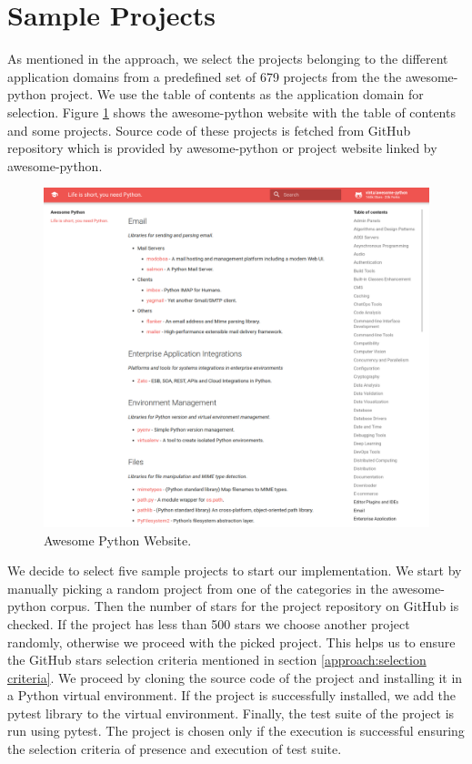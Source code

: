 \section{Sample Projects}
\label{impl:Sample Projects}
As mentioned in the approach, we select the projects belonging to the different application domains from a predefined set of 679 projects from the the awesome-python project.
We use the table of contents as the application domain for selection.
Figure \ref{fig:awesome-python-website} shows the awesome-python website with the table of contents and some projects.
Source code of these projects is fetched from GitHub repository which is provided by awesome-python or project website linked by awesome-python.  
\begin{figure}
    \centering
    \includegraphics[width=1\linewidth, height=1\linewidth]{figures/implementation/Awesome-Python-website3.png}
    \caption{Awesome Python Website.}
    \label{fig:awesome-python-website}
\end{figure}

We decide to select five sample projects to start our implementation.
We start by manually picking a random project from one of the categories in the awesome-python corpus.
Then the number of stars for the project repository on GitHub is checked.
If the project has less than 500 stars we choose another project randomly, otherwise we proceed with the picked project.
This helps us to ensure the GitHub stars selection criteria mentioned in section \ref{approach:selection criteria}.
We proceed by cloning the source code of the project and installing it in a Python virtual environment.
If the project is successfully installed, we add the pytest library to the virtual environment.
Finally, the test suite of the project is run using pytest. 
The project is chosen only if the execution is successful ensuring the selection criteria of presence and execution of test suite.

